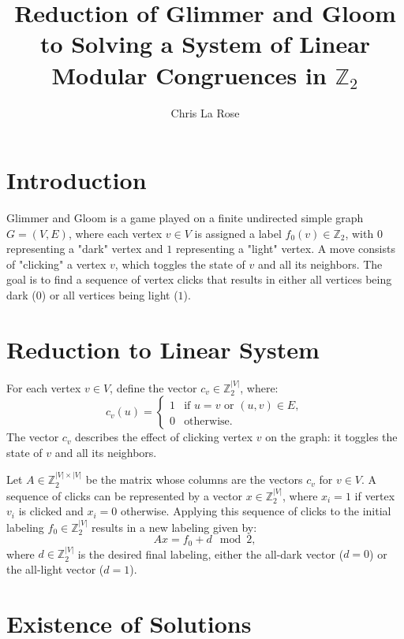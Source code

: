 \documentclass{article}
\title{Reduction of Glimmer and Gloom to Solving a System of Linear Modular Congruences in \(\mathbb{Z}_2\)}
\author{Chris La Rose}
\begin{document}
\maketitle

\section{Introduction}

Glimmer and Gloom is a game played on a finite undirected simple graph \( G = (V, E) \), where each vertex \( v \in V \) is assigned a label \( f_0(v) \in \mathbb{Z}_2 \), with \( 0 \) representing a "dark" vertex and \( 1 \) representing a "light" vertex. A move consists of "clicking" a vertex \( v \), which toggles the state of \( v \) and all its neighbors. The goal is to find a sequence of vertex clicks that results in either all vertices being dark (\( 0 \)) or all vertices being light (\( 1 \)).

\section{Reduction to Linear System}

For each vertex \( v \in V \), define the vector \( c_v \in \mathbb{Z}_2^{|V|} \), where:
\[
    c_v(u) = 
    \begin{cases} 
        1 & \text{if } u = v \text{ or } (u, v) \in E, \\
        0 & \text{otherwise}.
    \end{cases}
\]
The vector \( c_v \) describes the effect of clicking vertex \( v \) on the graph: it toggles the state of \( v \) and all its neighbors.

Let \( A \in \mathbb{Z}_2^{|V| \times |V|} \) be the matrix whose columns are the vectors \( c_v \) for \( v \in V \). A sequence of clicks can be represented by a vector \( x \in \mathbb{Z}_2^{|V|} \), where \( x_i = 1 \) if vertex \( v_i \) is clicked and \( x_i = 0 \) otherwise. Applying this sequence of clicks to the initial labeling \( f_0 \in \mathbb{Z}_2^{|V|} \) results in a new labeling given by:
\[
    A x = f_0 + d \mod 2,
\]
where \( d \in \mathbb{Z}_2^{|V|} \) is the desired final labeling, either the all-dark vector (\( d = 0 \)) or the all-light vector (\( d = 1 \)).

\section{Existence of Solutions}
\end{document}
